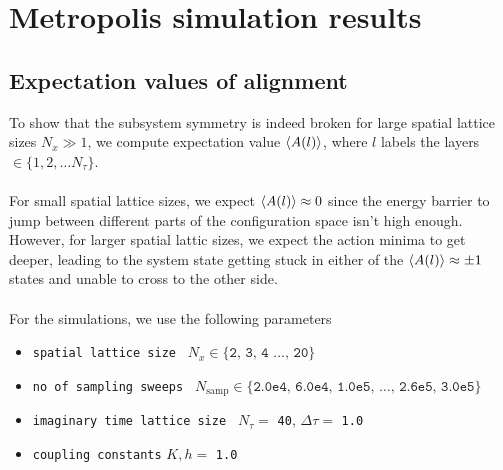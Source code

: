 \documentclass[../journal_main.tex]{subfiles}
\begin{document}
\section{Metropolis simulation results}
\subsection{Expectation values of alignment}
To show that the subsystem symmetry is indeed broken for large spatial lattice sizes $N_x \gg 1$, we compute expectation value $\expval{A(l)}$, where $l$ labels the layers $\in \{1, 2, \ldots N_\tau\}$. ~\\~\\
For small spatial lattice sizes, we expect $\expval{A(l)} \approx 0$ since the energy barrier to jump between different parts of the configuration space isn't high enough. However, for larger spatial lattic sizes, we expect the action minima to get deeper, leading to the system state getting stuck in either of the $\expval{A(l)} \approx \pm 1$ states and unable to cross to the other side.~\\~\\
For the simulations, we use the following parameters
\begin{itemize}[label={}]
    \setlength{\itemsep}{0.1em}
    \item \texttt{spatial lattice size } $N_x \in \{ \texttt{2, 3, 4 $\ldots$, 20} \}$  
    \item \texttt{no of sampling sweeps } $N_\text{samp} \in \{\texttt{2.0e4, 6.0e4, 1.0e5, $\ldots$, 2.6e5, 3.0e5} \}$
    \item \texttt{imaginary time lattice size } $N_\tau = $ \texttt{40}, \: $\Delta \tau = $ \texttt{1.0}
    \item \texttt{coupling constants} $K, h = $ \texttt{1.0} 
\end{itemize}
\end{document}
